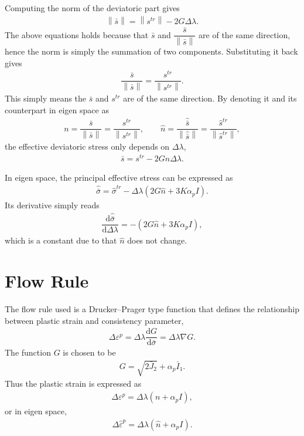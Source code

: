 \documentclass[5p]{elsarticle}
\newcommand*{\md}[1]{\mathrm{d}#1}
\newcommand*{\norm}[1]{\left\lVert#1\right\rVert}
\newcommand*{\ddfrac}[2]{\dfrac{\md#1}{\md#2}}
\begin{document}
Computing the norm of the deviatoric part gives
\begin{gather*}
\norm{\bar{s}}=\norm{s^{tr}}-2G\Delta\lambda.
\end{gather*}
The above equations holds because that $\bar{s}$ and $\dfrac{\bar{s}}{\norm{\bar{s}}}$ are of the same direction, hence the norm is simply the summation of two components. Substituting it back gives
\begin{gather*}
\dfrac{\bar{s}}{\norm{\bar{s}}}=\dfrac{s^{tr}}{\norm{s^{tr}}}.
\end{gather*}
This simply means the $\bar{s}$ and $s^{tr}$ are of the same direction. By denoting it and its counterpart in eigen space as
\begin{gather*}
n=\dfrac{\bar{s}}{\norm{\bar{s}}}=\dfrac{s^{tr}}{\norm{s^{tr}}},\qquad{}\hat{n}=\dfrac{\hat{\bar{s}}}{\norm{\hat{\bar{s}}}}=\dfrac{\hat{s}^{tr}}{\norm{\hat{s}^{tr}}},
\end{gather*}
the effective deviatoric stress only depends on $\Delta\lambda$,
\begin{gather*}
\bar{s}=s^{tr}-2Gn\Delta\lambda.
\end{gather*}

In eigen space, the principal effective stress can be expressed as
\begin{gather*}
\hat{\bar{\sigma}}=\hat{\sigma}^{tr}-\Delta\lambda\left(2G\hat{n}+3K\alpha_pI\right).
\end{gather*}
Its derivative simply reads
\begin{gather}
\ddfrac{\hat{\bar{\sigma}}}{\Delta\lambda}=-\left(2G\hat{n}+3K\alpha_pI\right),
\end{gather}
which is a constant due to that $\hat{n}$ does not change.
\section{Flow Rule}
The flow rule used is a Drucker--Prager type function that defines the relationship between plastic strain and consistency parameter,
\begin{gather*}
\Delta\varepsilon^p=\Delta\lambda\ddfrac{G}{\bar{\sigma}}=\Delta\lambda\nabla{}G.
\end{gather*}
The function $G$ is chosen to be
\begin{gather*}
G=\sqrt{2\bar{J}_2}+\alpha_p\bar{I}_1.
\end{gather*}
Thus the plastic strain is expressed as
\begin{gather*}
\Delta\varepsilon^p=\Delta\lambda\left(n+\alpha_pI\right),
\end{gather*}
or in eigen space,
\begin{gather*}
\Delta\hat{\varepsilon}^p=\Delta\lambda\left(\hat{n}+\alpha_pI\right).
\end{gather*}
\end{document}
